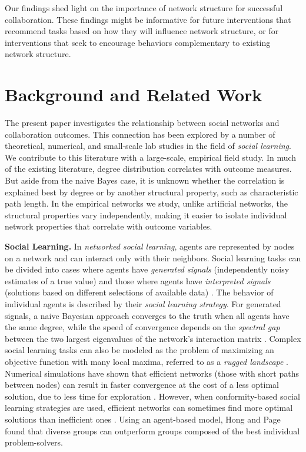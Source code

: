 Our findings shed light on the importance of network structure for successful
collaboration.
These findings might be informative for future interventions that
recommend tasks based on how they will
influence network structure,
or for interventions that seek to encourage behaviors
complementary to existing network structure.

\section{Background and Related Work}
\label{sec:background}
The present paper investigates the relationship between social networks
and collaboration outcomes.
This connection has been explored by a number of theoretical,
numerical, and small-scale lab studies in the field of
{\em social learning}.
We contribute to this literature with a large-scale, empirical field study.
In much of the existing literature,
degree distribution correlates with outcome measures.
But aside from the naive Bayes case, it is unknown whether
the correlation is explained best by degree or by another structural property, such as characteristic path length.
In the empirical networks we study,
unlike artificial networks,
the structural properties vary independently,
making it easier to isolate individual
network properties that correlate with outcome variables.

{\bf Social Learning.} In {\em networked social learning},
agents are represented by nodes on a network
and can interact only with their neighbors.
Social learning tasks can be divided into cases where agents have {\em generated signals}
(independently noisy estimates of a true value)
and those where agents have {\em interpreted signals}
(solutions based on different selections of available data)
\cite{hong_interpreted_2009}.
The behavior of individual agents is described by their
{\em social learning strategy}.
For generated signals,
a naive Bayesian approach converges to the truth
when all agents have the same degree,
while the speed of convergence depends on the {\em spectral gap}
between the two largest eigenvalues of the network's interaction matrix
\cite{degroot_reaching_1974,golub_naive_2010}.
Complex social learning tasks can also be modeled as the problem
of maximizing an objective function with many local maxima,
referred to as a {\em rugged landscape}
\cite{lazer_network_2007,mason_propagation_2008,mason_collaborative_2012,grim_scientific_2013,barkoczi_social_2016}.
Numerical simulations have shown that efficient networks
(those with short paths between nodes)
can result in faster convergence at the cost of a less optimal solution,
due to less time for exploration
\cite{mason_propagation_2008,grim_scientific_2013}.
However, when conformity-based social learning strategies are used,
efficient networks can sometimes find more optimal solutions than
inefficient ones \cite{barkoczi_social_2016}.
Using an agent-based model, Hong and Page  found that
diverse groups can outperform groups composed of the best individual
problem-solvers.


